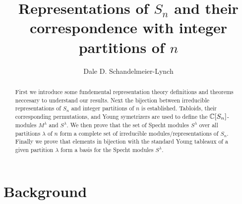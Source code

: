 \documentclass[11 pt]{amsart}
\title{Representations of $S_n$ and their correspondence with integer partitions of $n$}
\author{Dale D. Schandelmeier-Lynch}
\theoremstyle{plain}   %
\theoremstyle{definition}
\theoremstyle{remark}
\numberwithin{equation}{section}
\begin{document}
\begin{abstract}
  First we introduce some fundemental representation theory definitions and theorems neccesary to understand our results.
  Next the bijection between irreducible representations of $S_n$ and integer partitions of $n$ is established.
  Tabloids, their corresponding permutations, and Young symetrizers are used to define the $\mathbb{C}[S_n]$-modules $M^\lambda$ and $S^\lambda$.
  We then prove that the set of Specht modules $S^\lambda$ over all partitions $\lambda$ of $n$ form a complete set of irreducible modules/representations
  of $S_n$.
  Finally we prove that elements in bijection with the standard Young tableaux of a given partition $\lambda$ form a basis for the Specht modules
  $S^\lambda$.
 
\end{abstract}


\maketitle

\section{Background}
\end{document}
